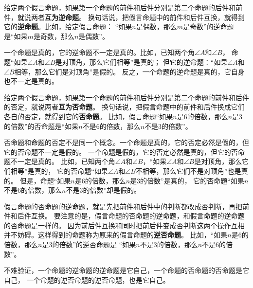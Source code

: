 \documentclass[12pt,UTF8]{ctexbook}
\begin{document}
给定两个假言命题，如果第一个命题的前件和后件分别是第二个命题的后件和前件，就说两者\textbf{互为逆命题}。
换句话说，把假言命题中的前件和后件互换，就得到它的\textbf{逆命题}。比如，给定假言命题：
“如果$n$是偶数，那么$m$是奇数”的逆命题是“如果$m$是奇数，那么$n$是偶数”。

一个命题是真的，它的逆命题不一定是真的。比如，已知两个角$\angle A$和$\angle B$，
命题“如果$\angle A$和$\angle B$是对顶角，那么它们相等”是真的；
但它的逆命题：“如果$\angle A$和$\angle B$相等，那么它们是对顶角”是假的。
反之，一个命题的逆命题是真的，它自身也不一定是真的。

给定两个假言命题，如果第一个命题的前件和后件分别是第二个命题的前件和后件的否定，就说两者\textbf{互为否命题}。
换句话说，把假言命题中的前件和后件换成它们各自的否定，就得到它的\textbf{否命题}。
比如，假言命题“如果$n$是$6$的倍数，那么$n$是$3$的倍数”的否命题是“如果$n$不是$6$的倍数，那么$n$不是$3$的倍数”。

否命题和命题的否定不是同一个概念。一个命题是真的，它的否定必然是假的，但它的否命题不一定是假的。
一个命题是假的，它的否定必然是真的，但它的否命题不一定是真的。
比如，已知两个角$\angle A$和$\angle B$，“如果$\angle A$和$\angle B$是对顶角，那么它们相等”是真的，
它的否命题“如果$\angle A$和$\angle B$不相等，那么它们不是对顶角”也是真的。
但是，命题“如果$n$是$6$的倍数，那么$n$是$3$的倍数”是真的，
它的否命题“如果$n$不是$6$的倍数，那么$n$不是$3$的倍数”却是假的。

假言命题的否命题的逆命题，就是先把前件和后件中的判断都改成否判断，再把前件和后件互换。
要注意的是，假言命题的否命题的逆命题，和假言命题的逆命题的否命题是一样的。
因为前后件互换和同时把前后件变成否判断这两个操作互相并不妨碍。这样得到的命题称为原来的假言命题的\textbf{逆否命题}。
比如，“如果$n$是$6$的倍数，那么$n$是$3$的倍数”的逆否命题是
“如果$n$不是$3$的倍数，那么$n$不是$6$的倍数”。

不难验证，一个命题的逆命题的逆命题是它自己，一个命题的否命题的否命题是它自己，
一个命题的逆否命题的逆否命题，也是它自己。
\end{document}
